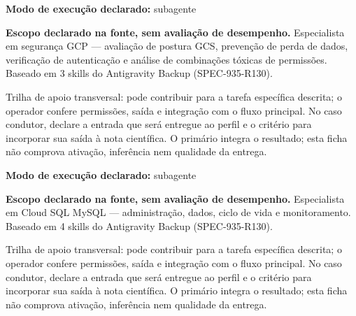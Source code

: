 \begin{arquitetura}
\textbf{Modo de execução declarado:} subagente
\end{arquitetura}


\begin{descricao}
\textbf{Escopo declarado na fonte, sem avaliação de desempenho.}
Especialista em segurança GCP — avaliação de postura GCS, prevenção de perda de dados, verificação de autenticação e análise de combinações tóxicas de permissões. Baseado em 3 skills do Antigravity Backup (SPEC-935-R130).
\end{descricao}

\begin{funcao}
Trilha de apoio transversal: pode contribuir para a tarefa específica descrita; o operador confere permissões, saída e integração com o fluxo principal. No caso condutor, declare a entrada que será entregue ao perfil e o critério para incorporar sua saída à nota científica. O primário integra o resultado; esta ficha não comprova ativação, inferência nem qualidade da entrega.
\end{funcao}

\begin{arquitetura}
\textbf{Modo de execução declarado:} subagente
\end{arquitetura}


\begin{descricao}
\textbf{Escopo declarado na fonte, sem avaliação de desempenho.}
Especialista em Cloud SQL MySQL — administração, dados, ciclo de vida e monitoramento. Baseado em 4 skills do Antigravity Backup (SPEC-935-R130).
\end{descricao}

\begin{funcao}
Trilha de apoio transversal: pode contribuir para a tarefa específica descrita; o operador confere permissões, saída e integração com o fluxo principal. No caso condutor, declare a entrada que será entregue ao perfil e o critério para incorporar sua saída à nota científica. O primário integra o resultado; esta ficha não comprova ativação, inferência nem qualidade da entrega.
\end{funcao}

